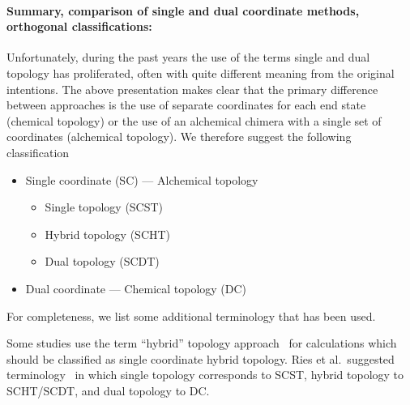 \documentclass[9pt,bestpractices]{livecoms}
\newcommand{\sbnote}[1]{%
  {\bfseries{}[SB: }%
  {\textcolor{blue}{#1}}{\bfseries{}]}
}
\begin{document}

\paragraph{Summary, comparison of single and dual coordinate methods, orthogonal classifications:}


Unfortunately, during the past years the use of the terms single and dual topology has proliferated, often with quite different meaning from the original intentions. The above presentation makes clear that the primary difference between approaches is the use of separate coordinates for each end state (chemical topology) or the use of an alchemical chimera with a single set of coordinates (alchemical topology). We therefore suggest the following classification
\begin{itemize}
\item Single coordinate (SC) --- Alchemical topology
  \begin{itemize}
  \item Single topology (SCST)
  \item Hybrid topology (SCHT)
    \item Dual topology (SCDT)
  \end{itemize}
  \item Dual coordinate --- Chemical topology (DC)
  \end{itemize}
For completeness, we list some additional terminology that has been used.

Some studies use the term ``hybrid'' topology approach~\cite{gapsys2015pmx, gapsys2016accurate, gapsys2020large} for calculations which should be classified as single coordinate hybrid topology.  %
Ries et al.\ suggested terminology~\cite{Ries_2022} in which single topology corresponds to SCST, hybrid topology to SCHT/SCDT, and dual topology to DC.
\end{document}
